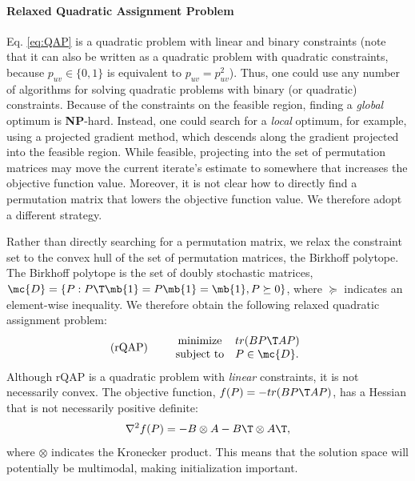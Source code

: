 \documentclass{article} %
\begin{document}
\vspace{-5pt}
\paragraph{Relaxed Quadratic Assignment Problem}

Eq. \ref{eq:QAP} is a quadratic problem with linear and binary constraints (note that it can also be written as a quadratic problem with quadratic constraints, because $p_{uv} \in \{0,1\}$ is equivalent to $p_{uv}=p_{uv}^2$).  Thus, one could use any number of algorithms for solving quadratic problems with binary (or quadratic) constraints.  Because of the constraints on the feasible region, finding a \emph{global} optimum is \textbf{NP}-hard.  Instead, one could search for a \emph{local} optimum, for example, using a projected gradient method, which descends along the gradient projected into the feasible region.  While feasible, projecting into the set of permutation matrices may move the current iterate's estimate to somewhere that increases the objective function value.  Moreover, it is not clear how to directly find a permutation matrix that lowers the objective function value.  We therefore adopt a different strategy.

Rather than directly searching for a permutation matrix, we relax the constraint set to the convex hull of the set of permutation matrices, the Birkhoff polytope.  The Birkhoff polytope is the set of doubly stochastic matrices, $\mc{D}=\{P : P\T \mb{1} =  P \mb{1} = \mb{1}, P \succeq 0\}$, where $\succeq$ indicates an element-wise inequality. We therefore obtain the following relaxed quadratic assignment problem:
\begin{equation}
\text{(rQAP)} \qquad  
\begin{array}{cl}
			\text{minimize}   & tr(B P\T AP) \\
			\text{subject to}  &P \in \mc{D}.   
\end{array}\label{eq:rQAP}
\end{equation}
Although rQAP is a quadratic problem with \emph{linear} constraints, it is not necessarily convex.  The objective function, $f(P)=- tr(B P\T AP)$, has a Hessian that is not necessarily positive definite:
\begin{align*}
	\nabla^2 f(P)  =  - B \otimes A - B\T \otimes A\T,
\end{align*}
where $\otimes$ indicates the Kronecker product. This means that the solution space will potentially be multimodal, making initialization important.  
\end{document}
